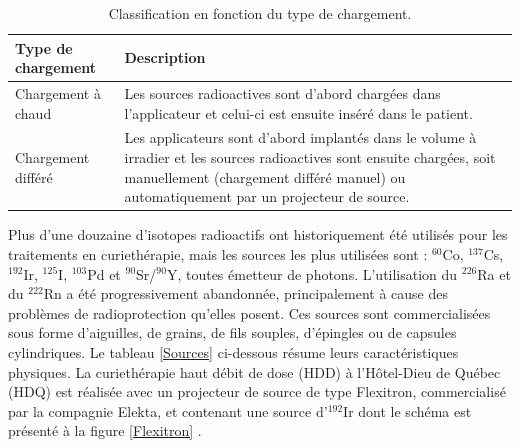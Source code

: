 %
\begin {table}[ht!]
\caption{Classification en fonction du type de chargement.}
\label{TypeChargement} 
\renewcommand{\arraystretch}{1.4}
	\begin{tabular}{p{5.5cm} p{9.0cm}}
		\toprule[1.3pt]
        \hline
        Type de chargement       &                            Description   \\ 
        \hline
        Chargement à chaud       & Les sources radioactives sont d’abord chargées dans l’applicateur et celui-ci est ensuite inséré  		 dans le patient.\\ 
		Chargement différé 	     &  Les applicateurs sont d'abord implantés dans le volume à irradier et les sources radioactives 		  sont ensuite chargées, soit manuellement (chargement différé manuel) ou automatiquement par un projecteur de source. \\ 
        \bottomrule[1.3pt]
	\end{tabular} 
\end {table}
%
Plus d’une douzaine d’isotopes radioactifs ont historiquement été utilisés pour les traitements en curiethérapie, mais les sources les plus utilisées sont : ${}^{60}$Co, ${}^{137}$Cs, ${}^{192}$Ir, ${}^{125}$I, ${}^{103}$Pd et ${}^{90}$Sr/${}^{90}$Y, toutes émetteur de photons. L’utilisation du ${}^{226}$Ra et du ${}^{222}$Rn a été progressivement abandonnée, principalement à cause des problèmes de radioprotection qu’elles posent. Ces sources sont commercialisées sous forme d’aiguilles, de grains, de fils souples, d’épingles ou de capsules cylindriques. Le tableau \ref{Sources} ci-dessous résume leurs caractéristiques physiques\cite{Podgorsak, Baltas@2006}. La curiethérapie haut débit de dose (HDD)  à l’Hôtel-Dieu de Québec (HDQ)  est réalisée avec un projecteur de source de type Flexitron, commercialisé par la compagnie Elekta, et contenant une source d'${}^{192}$Ir dont le schéma est présenté à la figure \ref{Flexitron} \cite{Alizadeh}.
%
\vspace{2.0cm}
